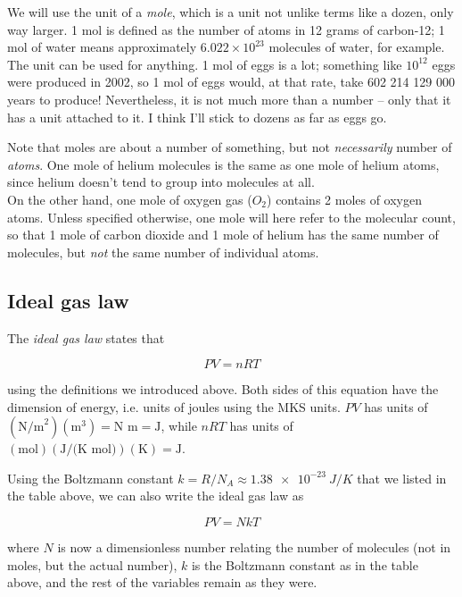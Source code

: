 \documentclass[8.01x]{subfiles}
\begin{document}
We will use the unit of a \emph{mole}, which is a unit not unlike terms like a dozen, only way larger. 1 mol is defined as the number of atoms in 12 grams of carbon-12; 1 mol of water means approximately $6.022 \times 10^{23}$ molecules of water, for example. The unit can be used for anything. 1 mol of eggs is a lot; something like $10^{12}$ eggs were produced in 2002, so 1 mol of eggs would, at that rate, take 602 214 129 000 years to produce! Nevertheless, it is not much more than a number -- only that it has a unit attached to it. I think I'll stick to dozens as far as eggs go.

Note that moles are about a number of something, but not \emph{necessarily} number of \emph{atoms}. One mole of helium molecules is the same as one mole of helium atoms, since helium doesn't tend to group into molecules at all.\\
On the other hand, one mole of oxygen gas ($O_2$) contains 2 moles of oxygen atoms. Unless specified otherwise, one mole will here refer to the molecular count, so that 1 mole of carbon dioxide and 1 mole of helium has the same number of molecules, but \emph{not} the same number of individual atoms.

\subsection{Ideal gas law}

The \emph{ideal gas law} states that

\begin{equation}
P V = n R T
\end{equation}

using the definitions we introduced above. Both sides of this equation have the dimension of energy, i.e. units of joules using the MKS units. $P V$ has units of $(\text{N/m}^2)(\text{m}^3) = \text{N m} = \text{J}$, while $n R T$ has units of $(\text{mol})(\text{J/(K mol)})(\text{K}) = \text{J}$.

Using the Boltzmann constant $k = R/N_A \approx \SI{1.38e-23}{J/K}$ that we listed in the table above, we can also write the ideal gas law as

\begin{equation}
P V = N k T
\end{equation}

where $N$ is now a dimensionless number relating the number of molecules (not in moles, but the actual number), $k$ is the Boltzmann constant as in the table above, and the rest of the variables remain as they were.
\end{document}
